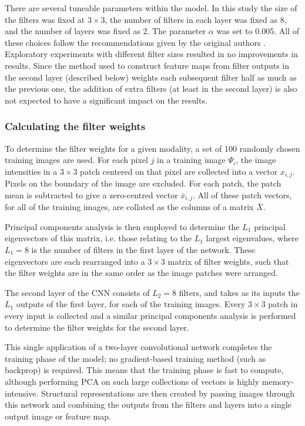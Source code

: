 \documentclass{report}
\begin{document}
There are several tuneable parameters within the model. In this study the size of the filters was fixed at $3 \times 3$, the number of filters in each layer was fixed as 8, and the number of layers was fixed as 2. The parameter $\alpha$ was set to 0.005. All of these choices follow the recommendations given by the original authors \citep{zhu2018pcanet}. Exploratory experiments with different filter sizes resulted in no improvements in results. Since the method used to construct feature maps from filter outputs in the second layer (described below) weights each subsequent filter half as much as the previous one, the addition of extra filters (at least in the second layer) is also not expected to have a significant impact on the results.

\subsubsection{Calculating the filter weights}
To determine the filter weights for a given modality, a set of 100 randomly chosen training images are used. For each pixel $j$ in a training image $\Psi_i$, the image intensities in a $3 \times 3$ patch centered on that pixel are collected into a vector $x_{i,j}$. Pixels on the boundary of the image are excluded. For each patch, the patch mean is subtracted to give a zero-centred vector $\bar{x}_{i,j}$. All of these patch vectors, for all of the training images, are collated as the columns of a matrix $\bar{X}$. 

Principal components analysis is then employed to determine the $L_1$ principal eigenvectors of this matrix, i.e. those relating to the $L_1$ largest eigenvalues, where $L_1=8$ is the number of filters in the first layer of the network. These eigenvectors are each rearranged into a $3 \times 3$ matrix of filter weights, such that the filter weights are in the same order as the image patches were arranged.

The second layer of the CNN consists of $L_2=8$ filters, and takes as its inputs the $L_1$ outputs of the first layer, for each of the training images. Every $3 \times 3$ patch in every input is collected and a similar principal components analysis is performed to determine the filter weights for the second layer.

This single application of a two-layer convolutional network completes the training phase of the model; no gradient-based training method (such as backprop) is required. This means that the training phase is fast to compute, although performing PCA on such large collections of vectors is highly memory-intensive. Structural representations are then created by passing images through this network and combining the outputs from the filters and layers into a single output image or feature map.
\end{document}
